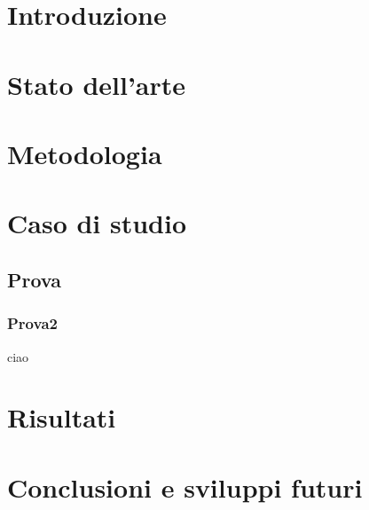 \documentclass[a4paper,12pt]{report}
\begin{document}
\chapter{Introduzione}

\chapter{Stato dell'arte}

\chapter{Metodologia}

\chapter{Caso di studio}

\section{Prova}
\subsection{Prova2}
ciao
\chapter{Risultati}

\chapter{Conclusioni e sviluppi futuri}

\end{document}
